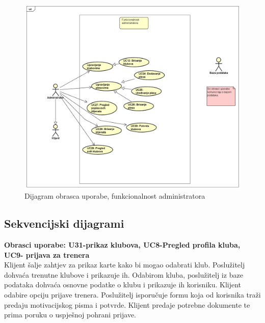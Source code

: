 					\begin{figure}[H]
						\centering
						\includegraphics[width=\textwidth]{slike/Diagram3.png}
						\caption{Dijagram obrasca uporabe, funkcionalnost administratora}
						\label{fig:my_label}
					\end{figure}
			
			\eject
			\subsection{Sekvencijski dijagrami}
				
				\textbf{Obrasci uporabe: U31-prikaz klubova, UC8-Pregled profila kluba, UC9- prijava za trenera}\\
				
				Klijent šalje zahtjev za prikaz karte kako bi mogao odabrati klub.
				Poslužitelj dohvaća trenutne klubove i prikazuje ih. Odabirom kluba, poslužitelj iz baze podataka dohvaća osnovne podatke o klubu i prikazuje ih korisniku. Klijent odabire opciju prijave trenera. Poslužitelj isporučuje formu koja od korisnika traži predaju motivacijskog pisma i potvrde. Klijent predaje potrebne dokumente te prima poruku o uspješnoj pohrani prijave.
				
